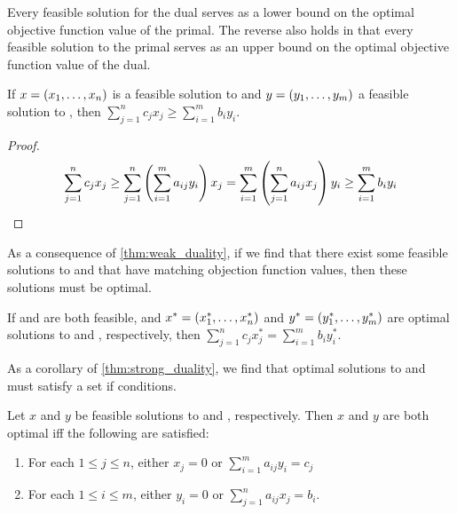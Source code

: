 Every feasible solution for the dual serves as a lower bound on the optimal objective function 
value of the primal. The reverse also holds in that every feasible solution to the primal 
serves as an upper bound on the optimal objective function value of the dual. 

\begin{theorem}
    If $x = \left( x_1, \ldots, x_n \right) $ is a feasible solution to \primal{} and $y = \left( y_1, \ldots, y_m \right) $ a feasible solution to \dual{}, 
    then $\sum_{j=1}^{n} c_j x_j \geq \sum_{i=1}^{m} b_i y_i$. 
    \label{thm:weak_duality}
\end{theorem}
\begin{proof}
    \begin{align*}
        \sum_{j=1}^{n} c_j x_j \geq \sum_{j=1}^{n} \left( \sum_{i=1}^{m} a_{ij} y_i \right) x_j
        =  \sum_{i=1}^{m} \left( \sum_{j=1}^{n} a_{ij} x_j \right) y_i 
        \geq \sum_{i=1}^{m} b_i y_i
    \end{align*}
\end{proof}

As a consequence of \cref{thm:weak_duality}, if we find that there exist some 
feasible solutions to \primal{} and \dual{} that have matching objection function values, 
then these solutions must be optimal. 

\begin{theorem}
    If \primal{} and \dual{} are both feasible, and $x^{\ast} = \left( x_1^{\ast}, \ldots, x_n^{\ast} \right)$
    and $y^{\ast} = \left( y_1^{\ast}, \ldots, y_m^{\ast} \right)$ are optimal solutions to \primal{} and \dual{}, respectively, 
    then $\sum_{j=1}^{n} c_j x_j^{\ast} = \sum_{i=1}^{m} b_i y_i^{\ast}$. 
    \label{thm:strong_duality}
\end{theorem}

As a corollary of \cref{thm:strong_duality}, we find that optimal solutions to \primal{} and \dual{}
must satisfy a set if conditions. 

\begin{corollary}
    Let $x$ and $y$ be feasible solutions to \primal{} and \dual{}, respectively. Then 
    $x$ and $y$ are both optimal iff the following are satisfied:
    \begin{enumerate}
        \item For each $1 \leq j \leq n$, either $x_j = 0$ or $\sum_{i=1}^{m} a_{ij}y_i = c_j$
        \item For each $1 \leq i \leq m$, either $y_i = 0$ or $\sum_{j=1}^{n} a_{ij} x_j = b_i$. 
    \end{enumerate}
\end{corollary}

